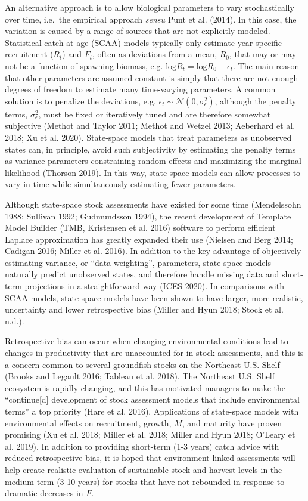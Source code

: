 \documentclass[]{article}
\begin{document}
An alternative approach is to allow biological parameters to vary
stochastically over time, i.e.~the empirical approach \emph{sensu} Punt
et al. (2014). In this case, the variation is caused by a range of
sources that are not explicitly modeled. Statistical catch-at-age (SCAA)
models typically only estimate year-specific recruitment (\(R_t\)) and
\(F_t\), often as deviations from a mean, \(R_0\), that may or may not
be a function of spawning biomass, e.g.
\(\text{log}R_t = \text{log}R_0 + \epsilon_t\). The main reason that
other parameters are assumed constant is simply that there are not
enough degrees of freedom to estimate many time-varying parameters. A
common solution is to penalize the deviations, e.g.
\(\epsilon_t \sim \mathcal{N}(0,\sigma^2_\epsilon)\), although the
penalty terms, \(\sigma^2_\epsilon\), must be fixed or iteratively tuned
and are therefore somewhat subjective (Methot and Taylor 2011; Methot
and Wetzel 2013; Aeberhard et al. 2018; Xu et al. 2020). State-space
models that treat parameters as unobserved states can, in principle,
avoid such subjectivity by estimating the penalty terms as variance
parameters constraining random effects and maximizing the marginal
likelihood (Thorson 2019). In this way, state-space models can allow
processes to vary in time while simultaneously estimating fewer
parameters.

Although state-space stock assessments have existed for some time
(Mendelssohn 1988; Sullivan 1992; Gudmundsson 1994), the recent
development of Template Model Builder (TMB, Kristensen et al. 2016)
software to perform efficient Laplace approximation has greatly expanded
their use (Nielsen and Berg 2014; Cadigan 2016; Miller et al. 2016). In
addition to the key advantage of objectively estimating variance, or
``data weighting'', parameters, state-space models naturally predict
unobserved states, and therefore handle missing data and short-term
projections in a straightforward way (ICES 2020). In comparisons with
SCAA models, state-space models have been shown to have larger, more
realistic, uncertainty and lower retrospective bias (Miller and Hyun
2018; Stock et al. n.d.).

Retrospective bias can occur when changing environmental conditions lead
to changes in productivity that are unaccounted for in stock
assessments, and this is a concern common to several groundfish stocks
on the Northeast U.S. Shelf (Brooks and Legault 2016; Tableau et al.
2018). The Northeast U.S. Shelf ecosystem is rapidly changing, and this
has motivated managers to make the ``continue{[}d{]} development of
stock assessment models that include environmental terms'' a top
priority (Hare et al. 2016). Applications of state-space models with
environmental effects on recruitment, growth, \(M\), and maturity have
proven promising (Xu et al. 2018; Miller et al. 2018; Miller and Hyun
2018; O'Leary et al. 2019). In addition to providing short-term (1-3
years) catch advice with reduced retrospective bias, it is hoped that
environment-linked assessments will help create realistic evaluation of
sustainable stock and harvest levels in the medium-term (3-10 years) for
stocks that have not rebounded in response to dramatic decreases in
\(F\).
\end{document}

